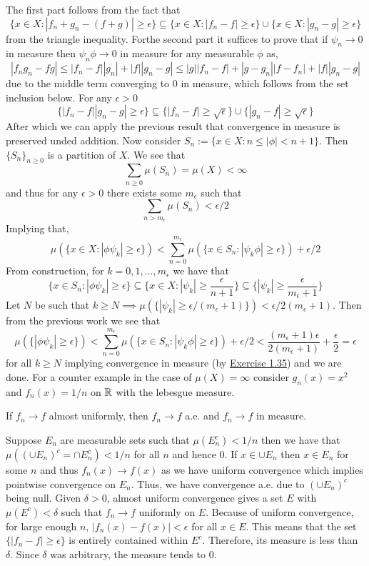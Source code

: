 \documentclass[12pt,a4paper]{article}
\begin{document}
\begin{solution}
The first part follows from the fact that 
\[
	\{x\in X:|f_n+g_n-(f+g)|\geq\epsilon\}\subseteq\{x\in X:|f_n-f|\geq\epsilon\}\cup\{x\in X:|g_n-g|\geq\epsilon\}
\]
from the triangle inequality. 
Forthe second part it suffices to prove that if $\psi_n\to 0$ in measure then $\psi_n \phi\to 0$ in measure for any measurable $\phi$ as,
\[
	|f_ng_n-fg|\leq |f_n-f||g_n|+|f||g_n-g|\leq|g||f_n-f|+|g-g_n||f-f_n|+|f||g_n-g|
\]
due to the middle term converging to $0$ in measure, which follows from the set inclusion below. 
For any $\epsilon>0$
\[
	\{|f_n-f||g_n-g|\geq\epsilon\}\subseteq\{|f_n-f|\geq\sqrt{\epsilon}\}\cup\{|g_n-f|\geq\sqrt{\epsilon}\}
\]
After which we can apply the previous result that convergence in measure is preserved unded addition.
Now consider $S_n:=\{x\in X:n\leq |\phi|<n+1\}$. Then $\{S_n\}_{n\geq 0}$ is a partition of $X$. We see that $$\sum_{n\geq 0}\mu(S_n)=\mu(X)<\infty$$ and thus for any $\epsilon>0$ there exists some $m_\epsilon$ such that $$\sum_{n>m_\epsilon}\mu(S_n)<\epsilon/2$$
Implying that,
\[
\mu(\{x\in X:|\phi\psi_k|\geq \epsilon\})<\sum_{n=0}^{m_\epsilon}\mu(\{x\in S_n:|\psi_k\phi|\geq\epsilon\})+\epsilon/2
\]
From construction, for $k=0,1,\ldots,m_\epsilon$ we have that
\[
	\{x\in S_n:|\phi\psi_k|\geq\epsilon\}\subseteq\{x\in X:|\psi_k|\geq\frac{\epsilon}{n+1}\}\subseteq\{|\psi_k|\geq\frac{\epsilon}{m_\epsilon+1}\}
\]
Let $N$ be such that $k\geq N\implies \mu(\{|\psi_k|\geq\epsilon/(m_\epsilon+1)
\})<\epsilon/2(m_\epsilon+1)$. 
Then from the previous work we see that
\[
	\mu(\{|\phi\psi_k|\geq\epsilon\})<\sum_{n=0}^{m_\epsilon}\mu(\{x\in S_n:|\psi_k\phi|\geq \epsilon\})+\epsilon/2
 <\frac{(m_\epsilon+1)\epsilon}{2(m_\epsilon+1)}+\frac{\epsilon}{2}=\epsilon
\]
for all $k\geq N$ implying convergence in measure (by \hyperref[prob:2-35]{Exercise 1.35}) and we are done. 
For a counter example in the case of $\mu(X)=\infty$ consider $g_n(x)=x^2$ and $f_n(x)=1/n$ on $\mathbb{R}$ with the lebesgue measure.
\end{solution}
\begin{problem}\label{prob:2-39}
If $f_n \to f$ almost uniformly, then $f_n \to f$ a.e. and $f_n \to f$ in measure.
\end{problem}
\begin{solution}
    Suppose $E_n$ are measurable sets such that $\mu(E_n^c)<1/n$ then we have that $\mu((\cup E_n)^c=\cap E_n^c)<1/n$ for all $n$ and hence $0$. 
	If $x\in\cup E_n$ then $x\in E_n$ for some $n$ and thus $f_n(x)\to f(x)$ as we have uniform convergence which implies pointwise convergence on $E_n$. 
	Thus, we have convergence a.e. due to $(\cup E_n)^c$ being null. 
	Given $\delta>0$, almost uniform convergence gives a set $E$ with $\mu(E^c)<\delta$ such that $f_n\to f$ uniformly on $E$. 
	Because of uniform convergence, for large enough $n$, $|f_n(x)-f(x)|<\epsilon$ for all $x\in E$. 
	This means that the set $\{|f_n-f|\geq\epsilon\}$ is entirely contained within $E^c$. 
	Therefore, its measure is less than $\delta$. 
	Since $\delta$ was arbitrary, the measure tends to $0$.
\end{solution}
\end{document}
